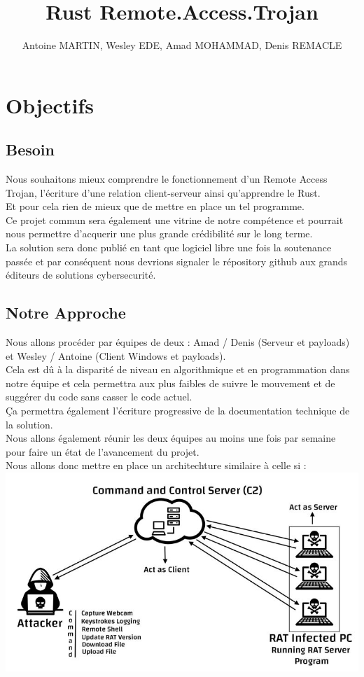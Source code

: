 \documentclass[a4paper]{article}
\title{Rust Remote.Access.Trojan}
\author{Antoine MARTIN, Wesley EDE, Amad MOHAMMAD, Denis REMACLE}
\begin{document}
   \maketitle
   \newpage
   \section{Objectifs}
   \subsection{Besoin}
Nous souhaitons mieux comprendre le fonctionnement d'un Remote Access Trojan, l'écriture d'une relation client-serveur ainsi qu'apprendre le Rust.\\
Et pour cela rien de mieux que de mettre en place un tel programme.
\bigskip
\\
Ce projet commun sera également une vitrine de notre compétence et pourrait nous permettre d'acquerir une plus grande crédibilité sur le long terme.\\
La solution sera donc publié en tant que logiciel libre une fois la soutenance passée et par conséquent nous devrions signaler le répository github aux grands éditeurs de solutions cybersecurité.
   \subsection{Notre Approche}
Nous allons procéder par équipes de deux : Amad / Denis (Serveur et payloads) et Wesley / Antoine (Client Windows et payloads).\\
Cela est dû à la disparité de niveau en algorithmique et en programmation dans notre équipe et cela permettra aux plus faibles de suivre le mouvement et de suggérer du code sans casser le code actuel.
\bigskip
\\
Ça permettra également l'écriture progressive de la documentation technique de la solution.\\
Nous allons également réunir les deux équipes au moins une fois par semaine pour faire un état de l'avancement du projet.
\bigskip
\\
Nous allons donc mettre en place un architechture similaire à celle si : \\
\includegraphics[scale=.5]{Schema.jpg}
\newpage
\end{document}
